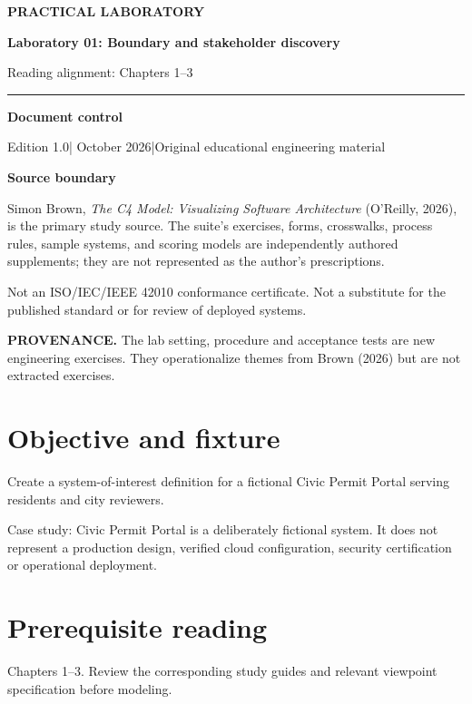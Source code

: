 \documentclass[10pt,letterpaper]{article}
\newcommand{\SourceNote}[1]{\par\smallskip\noindent\colorbox{C4Light}{\parbox{0.94\linewidth}{\footnotesize\textbf{PROVENANCE.} #1}}\par\medskip}
\newcommand{\DocStart}[3]{%
\begin{document}
\begin{titlepage}
\renewcommand{\thepage}{title-\arabic{page}}
\vspace*{0.55in}
{\sffamily\bfseries\small\color{C4Teal}#1}\par\vspace{0.24in}
{\sffamily\bfseries\fontsize{26}{31}\selectfont\color{C4Navy}#2}\par\vspace{0.18in}
{\large\color{C4Gray}#3}\par\vspace{0.4in}
\textcolor{C4Teal}{\rule{\linewidth}{1.15pt}}\par\vspace{0.24in}
\textbf{Document control}\par
Edition 1.0\quad|\quad 30 October 2026\quad|\quad Original educational engineering material\par
\vspace{0.17in}
\textbf{Source boundary}\par
Simon Brown, \emph{The C4 Model: Visualizing Software Architecture} (O'Reilly, 2026), is the primary study source. The suite's exercises, forms, crosswalks, process rules, sample systems, and scoring models are independently authored supplements; they are not represented as the author's prescriptions.\par
\vfill
{\small\color{C4Gray}Not an ISO/IEC/IEEE 42010 conformance certificate. Not a substitute for the published standard or for review of deployed systems.}\par
\end{titlepage}
}
\DocStart{PRACTICAL LABORATORY}{Laboratory 01: Boundary and stakeholder discovery}{Reading alignment: Chapters 1–3}
\SourceNote{The lab setting, procedure and acceptance tests are new engineering exercises. They operationalize themes from Brown (2026) but are not extracted exercises.}
\section{Objective and fixture}
Create a system-of-interest definition for a fictional Civic Permit Portal serving residents and city reviewers.

Case study: Civic Permit Portal is a deliberately fictional system. It does not represent a production design, verified cloud configuration, security certification or operational deployment.


\section{Prerequisite reading}
Chapters 1–3. Review the corresponding study guides and relevant viewpoint specification before modeling.
\end{document}
